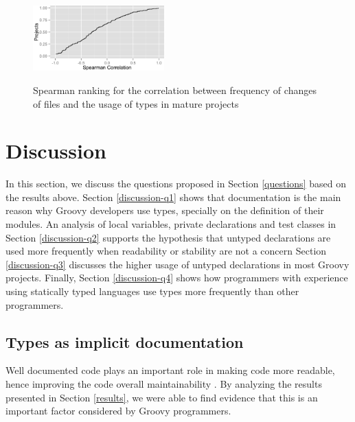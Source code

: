 \documentclass[preprint]{sigplanconf}
\begin{document}
\begin{figure}[h]
\centering \includegraphics[width=0.45\textwidth]{../analysis/result/change_commits_distribution.png} 
\label{fig:change_spearman} 
\caption{Spearman ranking for the correlation between frequency of changes of files and the usage of types in mature projects}
\end{figure}
%
%
\section{Discussion\label{discussion}}

In this section, we discuss the questions proposed in Section \ref{questions} based on the results above.
Section \ref{discussion-q1} shows that documentation is the main reason why Groovy developers use types, specially on the definition of their modules.
An analysis of local variables, private declarations and test classes in Section \ref{discussion-q2} supports the hypothesis that untyped declarations are used more frequently when readability or stability are not a concern
Section \ref{discussion-q3} discusses the higher usage of untyped declarations in most Groovy projects.
Finally, Section \ref{discussion-q4} shows how programmers with experience using statically typed languages use types more frequently than other programmers.



\subsection{Types as implicit documentation\label{discussion-q1}}
Well documented code plays an important role in making code more readable, hence improving the code overall maintainability \cite{Iso2004}.
By analyzing the results presented in Section \ref{results}, we were able to find evidence that this is an important factor considered by Groovy programmers.


\end{document}
